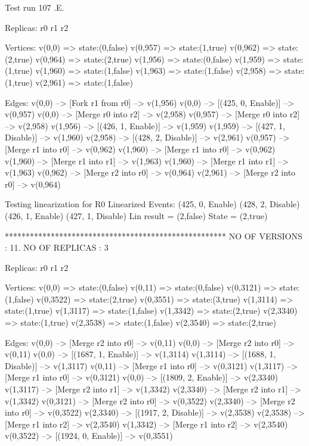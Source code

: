  Test run 107
.E.

Replicas:
r0
r1
r2

Vertices:
v(0,0) => state:(0,false)
v(0,957) => state:(1,true)
v(0,962) => state:(2,true)
v(0,964) => state:(2,true)
v(1,956) => state:(0,false)
v(1,959) => state:(1,true)
v(1,960) => state:(1,false)
v(1,963) => state:(1,false)
v(2,958) => state:(1,true)
v(2,961) => state:(1,false)

Edges:
v(0,0) --> [Fork r1 from r0] --> v(1,956)
v(0,0) --> [(425, 0, Enable)] --> v(0,957)
v(0,0) --> [Merge r0 into r2] --> v(2,958)
v(0,957) --> [Merge r0 into r2] --> v(2,958)
v(1,956) --> [(426, 1, Enable)] --> v(1,959)
v(1,959) --> [(427, 1, Disable)] --> v(1,960)
v(2,958) --> [(428, 2, Disable)] --> v(2,961)
v(0,957) --> [Merge r1 into r0] --> v(0,962)
v(1,960) --> [Merge r1 into r0] --> v(0,962)
v(1,960) --> [Merge r1 into r1] --> v(1,963)
v(1,960) --> [Merge r1 into r1] --> v(1,963)
v(0,962) --> [Merge r2 into r0] --> v(0,964)
v(2,961) --> [Merge r2 into r0] --> v(0,964)

Testing linearization for R0
Linearized Events:
(425, 0, Enable)
(428, 2, Disable)
(426, 1, Enable)
(427, 1, Disable)
Lin result = (2,false)
State = (2,true)



*****************************************************
NO OF VERSIONS : 11. NO OF REPLICAS : 3

Replicas:
r0
r1
r2

Vertices:
v(0,0) => state:(0,false)
v(0,11) => state:(0,false)
v(0,3121) => state:(1,false)
v(0,3522) => state:(2,true)
v(0,3551) => state:(3,true)
v(1,3114) => state:(1,true)
v(1,3117) => state:(1,false)
v(1,3342) => state:(2,true)
v(2,3340) => state:(1,true)
v(2,3538) => state:(1,false)
v(2,3540) => state:(2,true)

Edges:
v(0,0) --> [Merge r2 into r0] --> v(0,11)
v(0,0) --> [Merge r2 into r0] --> v(0,11)
v(0,0) --> [(1687, 1, Enable)] --> v(1,3114)
v(1,3114) --> [(1688, 1, Disable)] --> v(1,3117)
v(0,11) --> [Merge r1 into r0] --> v(0,3121)
v(1,3117) --> [Merge r1 into r0] --> v(0,3121)
v(0,0) --> [(1809, 2, Enable)] --> v(2,3340)
v(1,3117) --> [Merge r2 into r1] --> v(1,3342)
v(2,3340) --> [Merge r2 into r1] --> v(1,3342)
v(0,3121) --> [Merge r2 into r0] --> v(0,3522)
v(2,3340) --> [Merge r2 into r0] --> v(0,3522)
v(2,3340) --> [(1917, 2, Disable)] --> v(2,3538)
v(2,3538) --> [Merge r1 into r2] --> v(2,3540)
v(1,3342) --> [Merge r1 into r2] --> v(2,3540)
v(0,3522) --> [(1924, 0, Enable)] --> v(0,3551)

